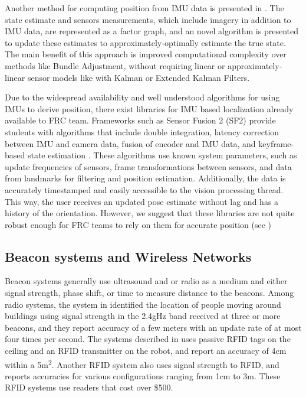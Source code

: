\documentclass{article}
\begin{document}
    Another method for computing position from IMU data is presented in \cite{vadim_indelman_information_2013}. The state estimate and sensors measurements, which include imagery in addition to IMU data, are represented as a factor graph, and an novel algorithm is presented to update these estimates to approximately-optimally estimate the true state. The main benefit of this approach is improved computational complexity over methods like Bundle Adjustment, without requiring linear or approximately-linear sensor models like with Kalman or Extended Kalman Filters.

    Due to the widespread availability and well understood algorithms for using IMUs to derive position, there exist libraries for IMU based localization already available to FRC team. Frameworks such as Sensor Fusion 2 (SF2) provide students with algorithms that include double integration, latency correction between IMU and camera data, fusion of encoder and IMU data, and keyframe-based state estimation \cite{kauai_labs_inc_video_2017}. These algorithms use known system parameters, such as update frequencies of sensors, frame transformations between sensors, and data from landmarks for filtering and position estimation. Additionally, the data is accurately timestamped and easily accessible to the vision processing thread. This way, the user receives an updated pose estimate without lag and has a history of the orientation. However, we suggest that these libraries are not quite robust enough for FRC teams to rely on them for accurate position (see )

  \subsection{Beacon systems and Wireless Networks}

    Beacon systems generally use ultrasound and or radio as a medium and either signal strength, phase shift, or time to measure distance to the beacons. Among radio systems, the system in \cite{bahl_radar:_2000} identified the location of people moving around buildings using signal strength in the 2.4gHz band received at three or more beacons, and they report accuracy of a few meters with an update rate of at most four times per second. The systems described in \cite{digiampaolo_mobile_2014} uses passive RFID tags on the ceiling and an RFID transmitter on the robot, and report an accuracy of 4\si{\centi\meter} within a 5\si{\square\meter}. Another RFID system \cite{saab_standalone_2011} also uses signal strength to RFID, and reports accuracies for various configurations ranging from 1\si{\centi\meter} to 3\si{\meter}. These RFID systems use readers that cost over \$500.
\end{document}

